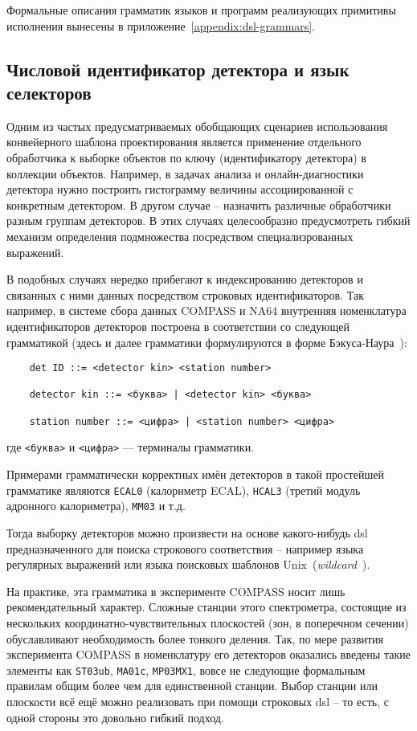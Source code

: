 Формальные описания грамматик языков и программ реализующих
примитивы исполнения вынесены в приложение~\ref{appendix:dsl-grammars}.

\subsection{Числовой идентификатор детектора и язык селекторов}

Одним из частых предусматриваемых обобщающих сценариев использования
конвейерного шаблона проектирования является применение отдельного
обработчика к выборке объектов по ключу (идентификатору детектора)
в коллекции объектов. Например, в задачах анализа и
онлайн-диагностики детектора
нужно построить гистограмму величины ассоциированной с конкретным
детектором. В другом случае -- назначить различные обработчики
разным группам детекторов. В этих случаях целесообразно предусмотреть гибкий
механизм определения подмножества посредством специализрованных
выражений.

В подобных случаях нередко прибегают к индексированию детекторов и связанных
с ними данных посредством строковых идентификаторов. Так например, в системе
сбора данных COMPASS и NA64 внутренняя номенклатура идентификаторов детекторов
построена в соответствии со следующей грамматикой (здесь и далее
грамматики формулируются в форме
Бэкуса-Наура~\cite{backusNaurAlgol1963revised}):

\begin{verbatim}
    det ID ::= <detector kin> <station number>
    
    detector kin ::= <буква> | <detector kin> <буква>
    
    station number ::= <цифра> | <station number> <цифра>
\end{verbatim}
где \texttt{<буква>} и \texttt{<цифра>} --- терминалы грамматики.

Примерами грамматически корректных имён детекторов в такой простейшей
грамматике являются \texttt{ECAL0} (калориметр ECAL), \texttt{HCAL3}
(третий модуль адронного калориметра), \texttt{MM03} и т.д.

Тогда выборку детекторов можно произвести на основе
какого-нибудь \acrshort{dsl} предназначенного для поиска строкового
соответствия -- например языка регулярных выражений или
языка поисковых шаблонов Unix~(\emph{wildcard}~\cite{wildcards-mcilroy1987research}).

На практике, эта грамматика в эксперименте COMPASS носит лишь
рекомендательный характер. Сложные станции этого спектрометра, состоящие из
нескольких координатно-чувствительных плоскостей (зон, в поперечном
сечении) обуславливают необходимость более тонкого деления. Так, по мере
развития эксперимента COMPASS в номенклатуру его детекторов
оказались введены такие элементы как \texttt{ST03ub}, \texttt{MA01c},
\texttt{MP03MX1}, вовсе не следующие формальным правилам общим более чем
для единственной станции. Выбор станции или плоскости всё ещё можно
реализовать при помощи строковых \acrshort{dsl} -- то есть, с одной стороны это
довольно гибкий подход.

